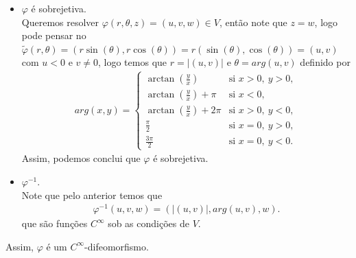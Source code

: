 \begin{homeworkProblem}[Seção 2-7]
\begin{solution}
\begin{itemize}
        Assim, temos que $\varphi$ é injetiva.
      \item $\varphi$ é sobrejetiva.\\
        Queremos resolver $\varphi(r,\theta,z)=(u,v,w)\in V$, então note que $z=w$, logo pode pensar no $\tilde{\varphi}(r,\theta)=(r\sin(\theta),r\cos(\theta))=r(\sin(\theta),\cos(\theta))=(u,v)$ com $u<0$ e $v\neq 0$, logo temos que $r=|(u,v)|$ e $\theta=arg(u,v)$ definido por
        \begin{align*}
          arg(x,y)=\begin{cases}
            \arctan\left(\frac{y}{x}\right) & \text{si } x>0,\ y>0, \\[6pt]
            \arctan\left(\frac{y}{x}\right)+\pi & \text{si } x<0, \\[6pt]
            \arctan\left(\frac{y}{x}\right)+2\pi & \text{si } x>0,\ y<0, \\[6pt]
            \frac{\pi}{2} & \text{si } x=0,\ y>0, \\[6pt]
            \frac{3\pi}{2} & \text{si } x=0,\ y<0.
          \end{cases}
        \end{align*}
        Assim, podemos conclui que $\varphi$ é sobrejetiva.
      \item $\varphi^{-1}$.\\
        Note que pelo anterior temos que
        \begin{align*}
          \varphi^{-1}(u,v,w)=\left( |(u,v)|,arg(u,v),w \right).
        \end{align*}
        que são funções $C^{\infty}$ sob as condições de $V$. 
    \end{itemize}
    Assim, $\varphi$ é um $C^{\infty}$-difeomorfismo.\\


\end{solution}
\end{homeworkProblem}
